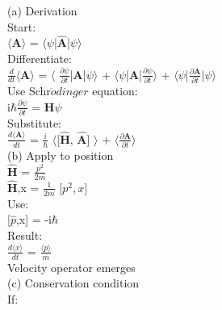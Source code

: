 \documentclass[10pt,fancy]{elegantbook}
\begin{document}
{(a) Derivation \\ 

Start: \\
 
    $\langle \mathbf {A} \rangle$ = $\langle \psi$|$\mathbf {\hat A}$|$\psi \rangle$ \\ 

Differentiate: \\
 
$\frac{d}{dt} \langle \mathbf {A} \rangle$ = $\langle$ $\frac{\partial \psi}{\partial t}$|$\mathbf A$|$\psi \rangle$ + $\langle \psi$|$\mathbf A$|$\frac{\partial \psi}{\partial t} \rangle$ + $\langle \psi$|$\frac{\partial \mathbf A}{\partial t}$|$\psi \rangle$   \\   
        
Use Schr$\ddot{o}dinger$ equation:  \\
  
    i$\hbar \frac{\partial \psi}{\partial t}$ = $\mathbf H \psi$ \\ 
    
Substitute: \\
 
$\frac{d \langle \mathbf A \rangle}{dt}$ = $\frac{i}{\hbar}$ $\langle$[$\mathbf {\hat H}$, $\mathbf {\hat A}$] $\rangle$ + $\langle \frac{\partial \mathbf A}{\partial t} \rangle$  \\  
                              
    
 (b) Apply to position \\  

$\mathbf {\hat H}$ = $\frac{p^2}{2m}$ \\
 
$\mathbf{\hat  H}$,x = $\frac{1}{2m}$ [$p^2,x]$  \\ 

Use:  \\
  
    [$\hat p$,x] = -i$\hbar$  \\
    
Result:  \\

    $\frac{d \langle x \rangle}{dt}$ = $\frac{\langle p \rangle}{m}$ \\
 
    Velocity operator emerges  \\ 
    
(c) Conservation condition \\ 

If: \\
 
}
\end{document}

